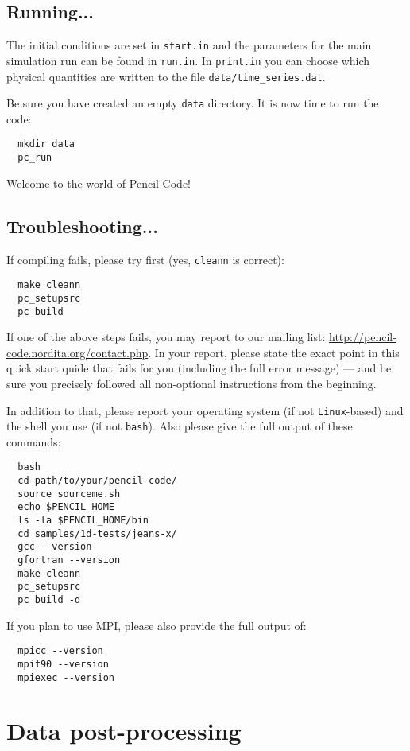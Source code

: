 \documentclass[a4paper,12pt]{article}
\begin{document}
\subsection{Running...}

The initial conditions are set in \verb|start.in| and the parameters for the main simulation run can be found in \verb|run.in|.
In \verb|print.in| you can choose which physical quantities are written to the file \verb|data/time_series.dat|.

Be sure you have created an empty \verb|data| directory. It is now time to run the code:
\begin{verbatim}
  mkdir data
  pc_run
\end{verbatim}
Welcome to the world of Pencil Code!

\subsection{Troubleshooting...}

If compiling fails, please try first (yes, \verb|cleann| is correct):
\begin{verbatim}
  make cleann
  pc_setupsrc
  pc_build
\end{verbatim}

If one of the above steps fails, you may report to our mailing list: \url{http://pencil-code.nordita.org/contact.php}.
In your report, please state the exact point in this quick start quide that fails for you (including the full error message) --- and be sure you precisely followed all non-optional instructions from the beginning.

In addition to that, please report your operating system (if not \verb|Linux|-based) and the shell you use (if not \verb|bash|).
Also please give the full output of these commands:
\begin{verbatim}
  bash
  cd path/to/your/pencil-code/
  source sourceme.sh
  echo $PENCIL_HOME
  ls -la $PENCIL_HOME/bin
  cd samples/1d-tests/jeans-x/
  gcc --version
  gfortran --version
  make cleann
  pc_setupsrc
  pc_build -d
\end{verbatim}

If you plan to use MPI, please also provide the full output of:
\begin{verbatim}
  mpicc --version
  mpif90 --version
  mpiexec --version
\end{verbatim}

\section{Data post-processing}
\end{document}
